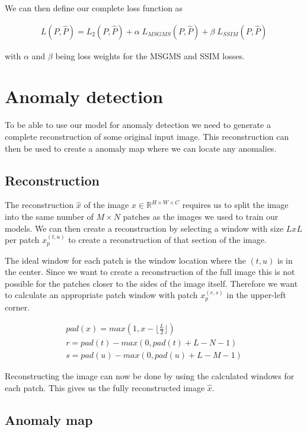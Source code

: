 We can then define our complete loss function as 

\begin{align}
L(P, \hat{P}) = L_2(P, \hat{P}) + \alpha \; L_{MSGMS}(P, \hat{P}) + \beta \; L_{SSIM}(P, \hat{P})
\end{align}

with $\alpha$ and $\beta$ being loss weights for the MSGMS and SSIM losses.

\section{Anomaly detection}\label{sec:methods:anomaly-detection}

To be able to use our model for anomaly detection we need to generate a complete reconstruction of some original input image. This reconstruction can then be used to create a anomaly map where we can locate any anomalies.

\subsection{Reconstruction}

The reconstruction $\hat{x}$ of the image $x \in \mathbb{R}^{H \times W \times C}$ requires us to split the image into the same number of $M \times N$ patches as the images we used to train our models.
We can then create a reconstruction by selecting a window with size $L x L$ per patch $x_p^{(t,u)}$ to create a reconstruction of that section of the image.

The ideal window for each patch is the window location where the $(t,u)$ is in the center. Since we want to create a reconstruction of the full image this is not possible for the patches closer to the sides of the image itself. Therefore we want to calculate an appropriate patch window with patch $x_p^{(r,s)}$ in the upper-left corner.

%
\begin{align}
pad(x) = max(1, x - \lfloor \frac{L}{2} \rfloor)\\
r = pad(t) - max(0, pad(t) + L - N - 1)\\
s = pad(u) - max(0, pad(u) + L - M - 1)
\end{align}
%

Reconstructing the image can now be done by using the calculated windows for each patch. This gives us the fully reconstructed image $\hat{x}$.

\subsection{Anomaly map}
\label{subsec:experimental-setup:anomaly-map}

